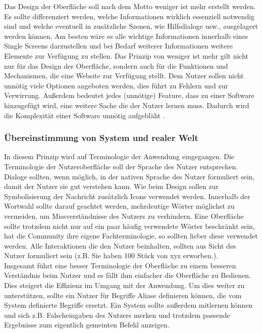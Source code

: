 \documentclass[utf8,biblatex]{lni}
\begin{document}
Das Design der Oberfläche soll nach dem Motto \glqq weniger ist mehr \grqq erstellt werden. Es sollte differenziert werden, welche Informationen wirklich essenziell notwendig sind und welche eventuell in zusätzliche Szenen, wie Hilfsdialoge usw., ausgelagert werden können. Am besten wäre es alle wichtige Informationen innerhalb eines Single Screens darzustellen und bei Bedarf weiterer Informationen weitere Elemente zur Verfügung zu stellen. Das Prinzip von weniger ist mehr gilt nicht nur für das Design der Oberfläche, sondern auch für die Funktionen und Mechanismen, die eine Website zur Verfügung stellt. Dem Nutzer sollen nicht unnötig viele Optionen angeboten werden, dies führt zu Fehlern und zur Verwirrung. Außerdem bedeutet jedes (unnötige) Feature, dass zu einer Software hinzugefügt wird, eine weitere Sache die der Nutzer lernen muss. Dadurch wird die Komplexität einer Software unnötig \glqq aufgebläht \grqq. 


\subsubsection{Übereinstimmung von System und realer Welt}
In diesem Prinzip wird auf Terminologie der Anwendung eingegangen. Die Terminologie der Nutzeroberfläche soll der Sprache des Nutzer entsprechen. Dialoge sollten, wenn möglich, in der nativen Sprache des Nutzer formuliert sein, damit der Nutzer sie gut verstehen kann. Wie beim Design sollen zur Symbolisierung der Nachricht zusätzlich Icons verwendet werden. Innerhalb der Wortwahl sollte darauf geachtet werden, mehrdeutige Wörter möglichst zu vermeiden, um Missverständnisse des Nutzers zu verhindern. Eine Oberfläche sollte trotzdem nicht nur auf ein paar häufig verwendete Wörter beschränkt sein, hat die Community ihre eigene Fachterminologie, so sollten lieber diese verwendet werden. Alle Interaktionen die den Nutzer beinhalten, sollten aus Sicht des Nutzer formuliert sein (z.B. \glqq Sie haben 100 Stück von xyz erworben.\grqq).\\
Insgesamt führt eine besser Terminologie der Oberfläche zu einem besseren Verständnis beim Nutzer und es fällt ihm einfacher die Oberfläche zu Bedienen. Dies steigert die Effizienz im Umgang mit der Anwendung. Um dies weiter zu unterstützen, sollte ein Nutzer für Begriffe Aliase definieren können, die vom System definierte Begriffe ersetzt. Ein System sollte außerdem mitlernen können und sich z.B. Falscheingaben des Nutzers merken und trotzdem passende Ergebnisse zum eigentlich gemeinten Befehl anzeigen.
\end{document}

